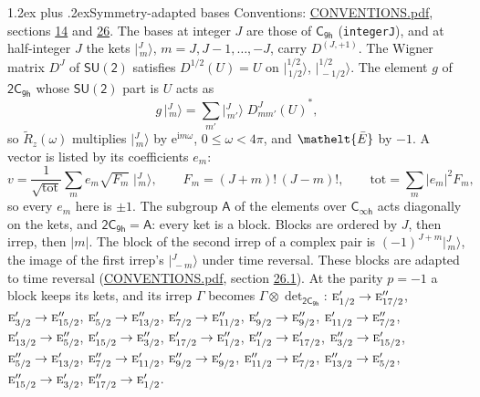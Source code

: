 \documentclass[10pt,a4paper]{article}
\makeatletter
\renewcommand\section{\@startsection{section}{1}{\z@}{-3ex plus -1ex minus -.2ex}%
  {1.2ex plus .2ex}{\normalfont\large\sffamily\bfseries\color{parttitle}}}
\numberwithin{equation}{section}
\newcommand{\eltfont}[1]{{\let\sigma\eltsigma\mathelt{#1}}}
\newcommand{\grp}[1]{\mathsf{#1}}
\newcommand{\irr}[1]{\text{\normalfont\scshape #1}}
\newcommand{\elt}[1]{\eltfont{#1}}
\newcommand{\iunit}{\mathrm{i}}
\newcommand{\expe}{\mathrm{e}}
\newcommand{\irrJp}[2]{D^{(#1,#2)}}
\newcommand{\wignerD}[1]{D^{#1}}
\newcommand{\conj}[1]{{#1}^{*}}
\newcommand{\irrprod}{\otimes}
\newcommand{\jm}[2]{\bigl\lvert{}^{#1}_{\,#2}\bigr\rangle}
\newcommand{\barred}[1]{\bar{#1}}
\newcommand{\lift}[1]{\tilde{#1}}
\makeatother
\begin{document}
\section{Symmetry-adapted bases}\label{s:bases}
Conventions: \href{../../CONVENTIONS.pdf}{CONVENTIONS.pdf}, sections \href{../../../rotation/CONVENTIONS.pdf\#conv.14}{14} and \href{../../CONVENTIONS.pdf\#conv.26}{26}.
\leavevmode\label{n:index.m}\label{n:vector.ket}The bases at integer $J$ are those of \href{../../../rotation/data/pdf/C9h.pdf}{$\grp{C_{9h}}$} (\texttt{integerJ}), and at half-integer $J$ the kets $\jm{J}{m}$, $m = J, J-1, \dots, -J$, carry $\irrJp{J}{+1}$. \label{n:matrix.wigner}The Wigner matrix $\wignerD{J}$ of $\grp{SU(2)}$ satisfies $\wignerD{1/2}(U) = U$ on $\jm{1/2}{1/2}$, $\jm{1/2}{-1/2}$. The element $g$ of $\grp{2C_{9h}}$ whose $\grp{SU(2)}$ part is $U$ acts as
\begin{equation}\label{e:action}g\,\jm{J}{m} = \sum_{m'} \jm{J}{m'}\; \conj{\wignerD{J}_{m m'}(U)},\end{equation}
so $\lift{R}_{z}(\omega)$ multiplies $\jm{J}{m}$ by $\expe^{\iunit m\omega}$, $0 \le \omega < 4\pi$, and $\elt{\barred{E}}$ by $-1$. \label{n:index.ketcoefficient}\label{n:vector.basis.symmetry}\label{n:index.ketweight}\label{n:index.total}A vector is listed by its coefficients $e_m$:
\begin{equation}\label{e:ket}v = \frac{1}{\sqrt{\mathrm{tot}}}\sum_m e_m\sqrt{F_m}\;\jm{J}{m},\qquad F_m = (J+m)!\,(J-m)!,\qquad \mathrm{tot} = \sum_m |e_m|^2F_m,\end{equation}
so every $e_m$ here is $\pm 1$.
\leavevmode\label{n:group.A}The subgroup $\grp{A}$ of the elements over $\grp{C_{\infty h}}$ acts diagonally on the kets, and $\grp{2C_{9h}} = \grp{A}$: every ket is a block. Blocks are ordered by $J$, then irrep, then $|m|$. The block of the second irrep of a complex pair is $(-1)^{J+m}\jm{J}{m}$, the image of the first irrep's $\jm{J}{-m}$ under time reversal. These blocks are adapted to time reversal (\href{../../CONVENTIONS.pdf}{CONVENTIONS.pdf}, section \href{../../CONVENTIONS.pdf\#conv.26.1}{26.1}).
At the parity $p = -1$ a block keeps its kets, and its irrep $\Gamma$ becomes $\Gamma \irrprod \det_{\grp{2C_{9h}}}$: $\irr{e}_{1/2}' \to \irr{e}_{17/2}''$, $\irr{e}_{3/2}' \to \irr{e}_{15/2}''$, $\irr{e}_{5/2}' \to \irr{e}_{13/2}''$, $\irr{e}_{7/2}' \to \irr{e}_{11/2}''$, $\irr{e}_{9/2}' \to \irr{e}_{9/2}''$, $\irr{e}_{11/2}' \to \irr{e}_{7/2}''$, $\irr{e}_{13/2}' \to \irr{e}_{5/2}''$, $\irr{e}_{15/2}' \to \irr{e}_{3/2}''$, $\irr{e}_{17/2}' \to \irr{e}_{1/2}''$, $\irr{e}_{1/2}'' \to \irr{e}_{17/2}'$, $\irr{e}_{3/2}'' \to \irr{e}_{15/2}'$, $\irr{e}_{5/2}'' \to \irr{e}_{13/2}'$, $\irr{e}_{7/2}'' \to \irr{e}_{11/2}'$, $\irr{e}_{9/2}'' \to \irr{e}_{9/2}'$, $\irr{e}_{11/2}'' \to \irr{e}_{7/2}'$, $\irr{e}_{13/2}'' \to \irr{e}_{5/2}'$, $\irr{e}_{15/2}'' \to \irr{e}_{3/2}'$, $\irr{e}_{17/2}'' \to \irr{e}_{1/2}'$.
\end{document}
